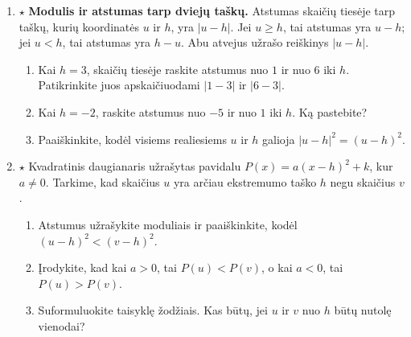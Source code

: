 \documentclass[12pt,a4paper]{article}
\begin{document}
\begin{enumerate}
\begin{center}
\begin{tikzpicture}[x=0.8cm,>=stealth]
\end{tikzpicture}\end{center}
\begin{enumerate}
\item Apskaičiuokite $|-5|$, $|2|$, $|0|$, $|-\frac{3}{2}|$.
\item Raskite visus skaičius $z$, kuriems $|z|=4$. Kiek sprendinių turi lygtis $|z|=0$? O lygtis $|z|=-1$? Paaiškinkite.
\item Paaiškinkite, kodėl kiekvienam realiajam $z$ galioja $|z|^2=z^2$. Panaudokite modulio apibrėžime pateiktus du atvejus.
\end{enumerate}
\item $\star$ \textbf{Modulis ir atstumas tarp dviejų taškų.} Atstumas skaičių tiesėje tarp taškų, kurių koordinatės $u$ ir $h$, yra $|u-h|$. Jei $u\ge h$, tai atstumas yra $u-h$; jei $u<h$, tai atstumas yra $h-u$. Abu atvejus užrašo reiškinys $|u-h|$.
\begin{center}\end{center}
\begin{enumerate}
\item Kai $h=3$, skaičių tiesėje raskite atstumus nuo $1$ ir nuo $6$ iki $h$. Patikrinkite juos apskaičiuodami $|1-3|$ ir $|6-3|$.
\item Kai $h=-2$, raskite atstumus nuo $-5$ ir nuo $1$ iki $h$. Ką pastebite?
\item Paaiškinkite, kodėl visiems realiesiems $u$ ir $h$ galioja $|u-h|^2=(u-h)^2$.
\end{enumerate}
\item $\star$ Kvadratinis daugianaris užrašytas pavidalu $P(x)=a(x-h)^2+k$, kur $a\ne0$. Tarkime, kad skaičius $u$ yra arčiau ekstremumo taško $h$ negu skaičius $v$.
\begin{enumerate}
\item Atstumus užrašykite moduliais ir paaiškinkite, kodėl $(u-h)^2<(v-h)^2$.
\item Įrodykite, kad kai $a>0$, tai $P(u)<P(v)$, o kai $a<0$, tai $P(u)>P(v)$.
\item Suformuluokite taisyklę žodžiais. Kas būtų, jei $u$ ir $v$ nuo $h$ būtų nutolę vienodai?

\end{enumerate}
\end{enumerate}
\end{document}
